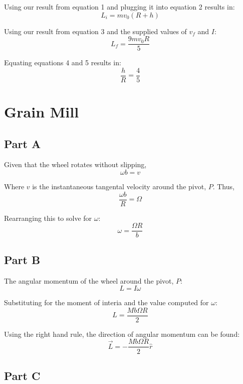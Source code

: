 \documentclass{article}
\begin{document}
Using our result from equation 1 and plugging it into equation 2 results in:
\begin{equation}
    L_{i} = mv_{0}( R + h )
\end{equation}

Using our result from equation 3 and the supplied values of $v_{f}$ and $I$: 
\begin{equation}
    L_{f} = \frac{ 9mv_{0}R }{ 5 }
\end{equation}

Equating equations 4 and 5 results in:
$$ \frac{ h }{ R } = \frac{ 4 }{ 5 } $$

\section{ Grain Mill }

\subsection*{ Part A }

Given that the wheel rotates without slipping,
$$ \omega b = v $$

Where $v$ is the instantaneous tangental velocity around the pivot, $P$. Thus,
$$ \frac{ \omega b }{ R } = \Omega $$

Rearranging this to solve for $\omega$:
$$ \omega = \frac{ \Omega R }{ b } $$

\subsection*{ Part B }

The angular momentum of the wheel around the pivot, $P$:
$$ L = I\omega $$

Substituting for the moment of interia and the value computed for $\omega$:
$$ L = \frac{ Mb\Omega R }{ 2 } $$

Using the right hand rule, the direction of angular momentum can be found:
$$ \vec{ L } = -\frac{ Mb\Omega R }{ 2 } \hat{ r } $$

\subsection*{ Part C }

\begin{figure}[H]
    \centering
\end{figure}
\end{document}
